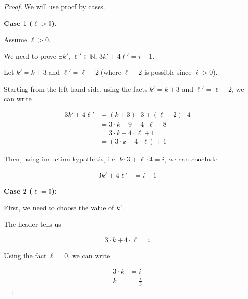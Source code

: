 \documentclass[12pt]{article}
\begin{document}
\begin{itemize}
\begin{proof}
    \bigskip

    We will use proof by cases.

    \bigskip

    \textbf{Case 1 ($\ell > 0$):}

    \bigskip

    Assume $\ell > 0$.

    \bigskip

    We need to prove $\exists k',\:\ell' \in \mathbb{N},\:3k' + 4\ell' = i + 1$.

    \bigskip

    Let $k' = k + 3$ and $\ell' = \ell - 2$ (where $\ell - 2$ is possible
    since $\ell > 0$).

    \bigskip

    Starting from the left hand side, using the facts $k' = k + 3$ and $\ell' = \ell - 2$, we can write

    \setcounter{equation}{0}
    \begin{align}
        3k' + 4\ell' &= (k+3) \cdot 3 + (\ell-2) \cdot 4\\
        &= 3 \cdot k + 9 + 4 \cdot \ell - 8\\
        &= 3 \cdot k + 4 \cdot \ell + 1\\
        &= (3 \cdot k + 4 \cdot \ell) + 1
    \end{align}

    \bigskip

    Then, using induction hypothesis, i.e. $k \cdot 3 + \ell \cdot 4 = i$, we can conclude

    \begin{align}
        3k' + 4\ell' &= i + 1
    \end{align}

    \bigskip

    \textbf{Case 2 ($\ell = 0$):}

    \bigskip

    First, we need to choose the value of $k'$.

    \bigskip

    The header tells us

    \begin{align}
        3 \cdot k + 4 \cdot \ell = i
    \end{align}

    \bigskip

    Using the fact $\ell = 0$, we can write

    \begin{align}
        3 \cdot k &= i\\
        k &= \frac{i}{3}
    \end{align}


\end{proof}
\end{itemize}
\end{document}
